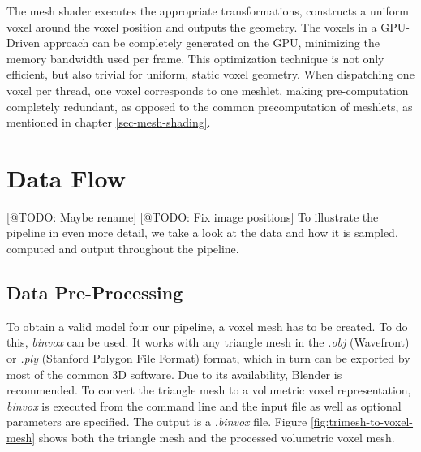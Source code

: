 The mesh shader executes the appropriate transformations, constructs a uniform voxel around the voxel position 
and outputs the geometry. The voxels in a \ac{GPU}-Driven approach can be completely generated on the \ac{GPU}, 
minimizing the memory bandwidth used per frame. This optimization technique is not only efficient, but also 
trivial for uniform, static voxel geometry. When dispatching one voxel per thread, one voxel corresponds 
to one meshlet, making pre-computation completely redundant, as opposed to the common precomputation of meshlets, 
as mentioned in chapter \ref{sec-mesh-shading}. 


\section{Data Flow} \label{sec-data-flow}

[@TODO: Maybe rename] [@TODO: Fix image positions]
To illustrate the pipeline in even more detail, we take a look at the data and how it is sampled, computed 
and output throughout the pipeline. 

\subsection*{Data Pre-Processing}

To obtain a valid model four our pipeline, a voxel mesh has to be created. To do this, \emph{binvox} 
\cite{binvox} can be used. It works with any triangle mesh in the \emph{.obj} (Wavefront) or \emph{.ply} 
(Stanford Polygon File Format) format, which in turn can be exported by most of the common 3D software. 
Due to its availability, Blender \cite{Blender} is recommended. To convert the triangle mesh to a volumetric 
voxel representation, \emph{binvox} is executed from the command line and the input file as well as optional 
parameters are specified. The output is a \emph{.binvox} file. Figure \ref{fig:trimesh-to-voxel-mesh} shows 
both the triangle mesh and the processed volumetric voxel mesh. 

